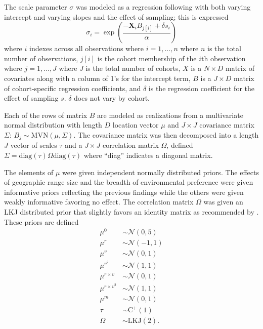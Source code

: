 \documentclass{article}
\begin{document}
The scale parameter \(\sigma\) was modeled as a regression following \citet{Kleinbaum2005} with both varying intercept and varying slopes and the effect of sampling; this is expressed
\begin{equation}
  \sigma_{i} = \exp\left(\frac{-\mathbf{X}_{i} B_{j[i]} + \delta s_{i}}{\alpha}\right)
  \label{eq:sigma}
\end{equation}
where \(i\) indexes across all observations where \(i = 1, \dots, n\) where \(n\) is the total number of observations, \(j[i]\) is the cohort membership of the \(i\)th observation where \(j = 1, \dots, J\) where \(J\) is the total number of cohorts, \(X\) is a \(N \times D\) matrix of covariates along with a column of 1's for the intercept term, \(B\) is a \(J \times D\) matrix of cohort-specific regression coefficients, and \(\delta\) is the regression coefficient for the effect of sampling \(s\). \(\delta\) does not vary by cohort.

Each of the rows of matrix \(B\) are modeled as realizations from a multivariate normal distribution with length \(D\) location vector \(\mu\) and \(J \times J\) covariance matrix \(\Sigma\): \(B_{j} \sim \mathrm{MVN}(\mu, \Sigma)\). The covariance matrix was then decomposed into a length \(J\) vector of scales \(\tau\) and a \(J \times J\) correlation matrix \(\Omega\), defined \(\Sigma = \mathrm{diag}(\tau) \Omega \mathrm{diag}(\tau)\) where ``diag'' indicates a diagonal matrix.

The elements of \(\mu\) were given independent normally distributed priors. The effects of geographic range size  and the breadth of environmental preference were given informative priors reflecting the previous findings while the others were given weakly informative favoring no effect. The correlation matrix \(\Omega\) was given an LKJ distributed prior \citep{Lewandowski2009} that slightly favors an identity matrix as recommended by \citet{stan-manual:2014}. These priors are defined
\begin{equation}
  \begin{aligned}
    \mu^{0} &\sim \mathcal{N}(0, 5) \\
    \mu^{r} &\sim \mathcal{N}(-1, 1) \\
    \mu^{v} &\sim \mathcal{N}(0, 1) \\
    \mu^{v^{2}} &\sim \mathcal{N}(1, 1) \\
    \mu^{r \times v} &\sim \mathcal{N}(0, 1) \\
    \mu^{r \times v^{2}} &\sim \mathcal{N}(1, 1) \\
    \mu^{m} &\sim \mathcal{N}(0, 1) \\
    \tau &\sim \mathrm{C^{+}}(1) \\
    \Omega &\sim \text{LKJ}(2).
  \end{aligned}
  \label{eq:sigma_prior}
\end{equation}
\end{document}

